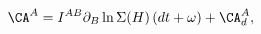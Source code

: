 \begin{equation} \label{Fssol}
 \CA^A = I^{AB} \partial_B \ln \Sigma(H) \, (dt + \omega) + \CA^A_d,
\end{equation}

